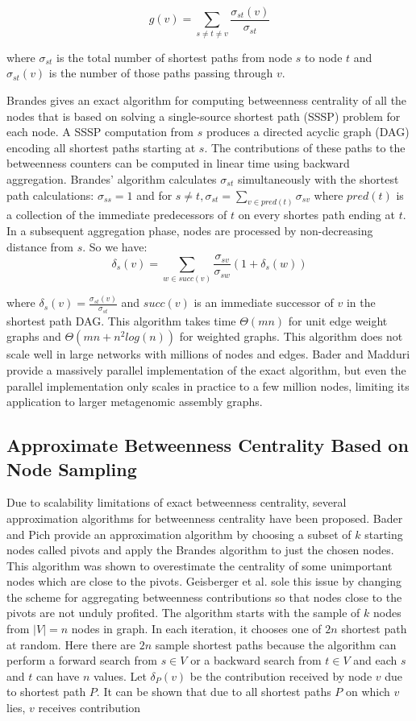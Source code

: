 \documentclass[runningheads,a4paper]{llncs}
\begin{document}
$$g(v) = \sum_{s \neq t \neq v} \frac{\sigma_{st}(v)}{\sigma_{st}}$$

where $\sigma_{st}$ is the total number of shortest paths from node $s$ to node $t$ and $\sigma_{st}(v)$ is the number of those paths passing through $v$.

Brandes\cite{brandes} gives an exact algorithm for computing betweenness centrality of all the nodes that is based on solving a single-source shortest path (SSSP) problem for each node. A SSSP computation from $s$ produces a directed acyclic graph (DAG) encoding all shortest paths starting at $s$. The contributions of these paths to the betweenness counters can be computed in linear time using backward aggregation. Brandes' algorithm calculates $\sigma_{st}$  simultaneously with the shortest path calculations: $\sigma_{ss} = 1$ and for $s \neq t, \sigma_{st} = \sum_{v \in pred(t)} \sigma_{sv}$ where $pred(t)$ is a collection of the immediate predecessors of  $t$ on every shortes path ending at $t$. In a subsequent aggregation phase, nodes are processed by non-decreasing distance from $s$. So we have: 
$$\delta_{s}(v) = \sum_{w \in succ(v)} \frac{\sigma_{sv}}{\sigma_{sw}}(1+\delta_{s}(w))$$

where $\delta_{s}(v) = \frac{\sigma_{st}(v)}{\sigma_{st}}$ and $succ(v)$ is an immediate successor of $v$  in the shortest path DAG.   
This algorithm takes time $\Theta(mn)$ for unit edge weight graphs and $\Theta(mn + n^{2}log(n))$ for weighted graphs. This algorithm does not scale well in large networks with millions of nodes and edges. Bader and Madduri\cite{bader} provide a massively parallel implementation of the exact algorithm, but even the parallel implementation only scales in practice to  a few million nodes, limiting its application to larger metagenomic assembly graphs.

\subsection*{Approximate Betweenness Centrality Based on Node Sampling}
Due to scalability limitations of exact betweenness centrality, several approximation algorithms for betweenness centrality have been proposed. Bader and Pich\cite{bp} provide an approximation algorithm by choosing a subset of $k$ starting nodes called pivots and apply the Brandes algorithm to just the chosen nodes. This algorithm was shown to overestimate the centrality of some unimportant nodes which are close to the pivots. Geisberger et al. \cite{sanders} sole this issue by changing the scheme for aggregating betweenness contributions so that nodes close to the pivots are not unduly profited. The algorithm starts with the sample of $k$ nodes from $|V| = n$ nodes in graph. In each iteration, it chooses one of $2n$ shortest path at random. Here there are $2n$ sample shortest paths because the algorithm can perform a forward search from $s \in V$ or a backward search from $t \in V$ and each $s$ and $t$ can have $n$ values. Let $\delta_{P}(v)$ be the contribution received by node $v$ due to shortest path $P$. It can be shown that \cite{sanders} due to all shortest paths $P$ on which $v$ lies, $v$ receives contribution 
\end{document}

